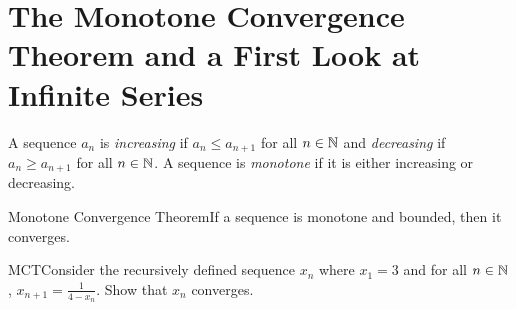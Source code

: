 
\section{The Monotone Convergence Theorem and a First Look at Infinite Series}

\begin{definition}
    A sequence \(a_n\) is \textit{increasing} if \(a_n \leq a_{n+1}\) for all \(n \in \mathbb{N}\) and \textit{decreasing} if \(a_n \geq a_{n+1}\) for all \(n \in \mathbb{N}\). A sequence is \textit{monotone} if it is either increasing or decreasing.
\end{definition}

\begin{ntheorem}
    {Monotone Convergence Theorem}If a sequence is monotone and bounded, then it converges.
\end{ntheorem}


\begin{example}
    {MCT}Consider the recursively defined sequence \(x_n\) where \(x_1 = 3\) and for all \(n \in \mathbb{N}\), \(x_{n + 1} = \frac{1}{4 - x_n}\). Show that \(x_n\) converges.
\end{example}

